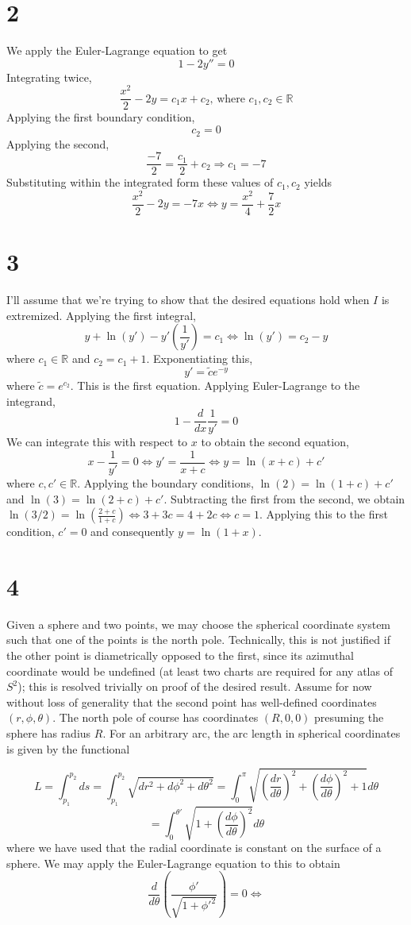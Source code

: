 \documentclass{article}
\begin{document}
\section*{2}
We apply the Euler-Lagrange equation to get
\[1-2y''=0\]
Integrating twice,
\[\frac{x^2}{2}-2y=c_1x+c_2\textrm{, where }c_1,c_2\in\mathbb{R}\]
Applying the first boundary condition,
\[c_2 = 0\]
Applying the second,
\[\frac{-7}{2}=\frac{c_1}{2}+c_2\Rightarrow c_1 = -7\]
Substituting within the integrated form these values of $c_1,c_2$ yields
\[\frac{x^2}{2}-2y=-7x\Leftrightarrow y =\frac{x^2}{4}+\frac{7}{2}x\]
\section*{3}
I'll assume that we're trying to show that the desired equations hold when $I$ is extremized.
Applying the first integral,
\[y+\ln(y')-y'\left( \frac{1}{y'} \right)=c_1\Leftrightarrow  \ln(y')=c_2-y\]
where $c_1\in\mathbb{R}$ and $c_2=c_1+1$.
Exponentiating this,
\[y'=\tilde{c}e^{-y}\]
where $\tilde{c}=e^{c_2}$. This is the first equation.
Applying Euler-Lagrange to the integrand,
\[1-\frac{d}{dx}\frac{1}{y'}= 0\]
We can integrate this with respect to $x$ to obtain the second equation,
\[x-\frac{1}{y'}=0\Leftrightarrow y' = \frac{1}{x+c}\Leftrightarrow y = \ln(x+c)+c'\]
where $c,c'\in\mathbb{R}$. Applying the boundary conditions, $\ln(2) = \ln(1+c)+c'$ and $\ln(3)=\ln(2+c)+c'$.
Subtracting the first from the second, we obtain $\ln(3/2) = \ln(\frac{2+c}{1+c}) \Leftrightarrow 3+3c=4+2c\Leftrightarrow c=1$.
Applying this to the first condition, $c'=0$ and consequently $y=\ln(1+x)$.

\section*{4}
Given a sphere and two points, we may choose the spherical coordinate system such that one of the points is the north pole.
Technically, this is not justified if the other point is diametrically opposed to the first, since its azimuthal coordinate would be undefined (at least two charts are required for any atlas of $S^2$); this is resolved trivially on proof of the desired result.
Assume for now without loss of generality that the second point has well-defined coordinates $(r,\phi,\theta)$. The north pole of course has coordinates $(R, 0, 0)$ presuming the sphere has radius $R$. For an arbitrary arc, the arc length in spherical coordinates is given by the functional

\[L=\int_{p_1}^{p_2}ds=\int_{p_1}^{p_2}\sqrt{dr^2+d\phi^2+d\theta^2}=\int_0^\pi\sqrt{\left( \frac{dr}{d\theta} \right)^2+\left( \frac{d\phi}{d\theta} \right)^2+1}d\theta\]
\[=\int_0^{\theta'}\sqrt{1+\left(\frac{d\phi}{d\theta}\right)^2}d\theta\]
where we have used that the radial coordinate is constant on the surface of a sphere.
We may apply the Euler-Lagrange equation to this to obtain
\[\frac{d}{d\theta}\left( \frac{\phi'}{\sqrt{1+\phi'^2}} \right)=0\Leftrightarrow \]
\end{document}
